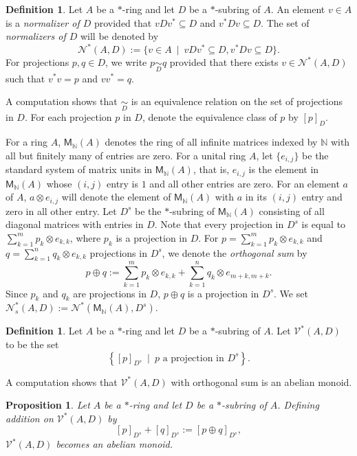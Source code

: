 \documentclass[11pt, letterpaper,final]{amsart}
\newcommand{\NN}{\mathbb{N}}
\newcommand{\V}{\mathcal{V}}
\newcommand{\N}{\mathcal{N}}
\newtheorem{prp}[thm]{Proposition}
\theoremstyle{definition}
\newtheorem{dfn}[thm]{Definition}
\theoremstyle{remark}
\begin{document}
\begin{dfn}
Let $A$ be a $*$-ring and let $D$ be a $*$-subring of $A$.  An element $v \in A$ is a \emph{normalizer of $D$} provided that $v D v^* \subseteq D$ and $v^* D v \subseteq D$. The set of \emph{normalizers of $D$} will be denoted by 
\[\N^*( A, D) := \{ v \in A \ \mid \  v D v^* \subseteq D, v^* D v \subseteq D \}.\]
For projections $p, q \in D$, we write $p \underset{D}{\sim} q$ provided that there exists $v \in \mathcal{N}^*(A, D)$ such that $v^*v = p$ and $vv^*=q$.  
\end{dfn}

A computation shows that $\underset{D}{\sim}$ is an equivalence relation on the set of projections in $D$.  For each projection $p$ in $D$, denote the equivalence class of $p$ by $[p]_{D}$.  

For a ring $A$, $\mathsf{M}_\NN(A)$ denotes the ring of all infinite matrices indexed by $\NN$ with all but finitely many of entries are zero.  For a unital ring $A$, let $\{ e_{i,j} \}$ be the standard system of matrix units in $\mathsf{M}_\NN(A)$, that is, $e_{i,j}$ is the element in $\mathsf{M}_\NN(A)$ whose $(i,j)$ entry is $1$ and all other entries are zero.  For an element $a$ of $A$, $a \otimes e_{i,j}$ will denote the element of $\mathsf{M}_{\NN} (A)$ with $a$ in its $(i,j)$ entry and zero in all other entry.  Let $D^s$ be the $*$-subring of $\mathsf{M}_{\NN} (A)$ consisting of all diagonal matrices with entries in $D$.  Note that every projection in $D^s$ is equal to $\sum_{k = 1}^m p_k \otimes e_{k,k}$, where $p_k$ is a projection in $D$.  For $p = \sum_{ k = 1}^m p_k \otimes e_{k,k}$ and $q = \sum_{k=1}^n q_k \otimes e_{k,k}$ projections in $D^s$, we denote the \emph{orthogonal sum} by 
$$p \oplus q:= \sum_{ k = 1}^m p_k \otimes e_{k,k} + \sum_{ k = 1}^n q_k \otimes e_{m+k, m+k }.$$
Since $p_k$ and $q_k$ are projections in $D$, $p\oplus q$ is a projection in $D^s$.  
We set $\N_s^*( A, D) := \N^* ( \mathsf{M}_\NN(A), D^s)$.

\begin{dfn}
Let $A$ be a $*$-ring and let $D$ be a $*$-subring of $A$.  Let $\V^*( A , D)$ to be the set 
$$\left\{ [ p ]_{ D^s } \ \mid \ p \text{ a projection in } D^s\right\}.$$
\end{dfn}
A computation shows that $\V^*( A , D)$ with orthogonal sum is an abelian monoid. 

\begin{prp}\label{lem:rel-ktheory}
Let $A$ be a $*$-ring and let $D$ be a $*$-subring of $A$.  Defining addition on $\V^*(A,D)$ by
$$[p]_{D^s } + [q]_{D^s} := [ p \oplus q ]_{ D^s },$$
$\V^*(A,D)$ becomes an abelian monoid.
\end{prp}
\end{document}
